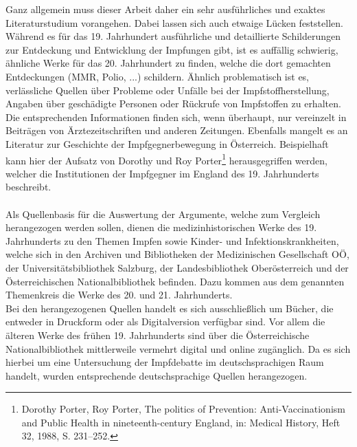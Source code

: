 \documentclass[
    a4paper,
    12pt,
    hyphens,
    chapterprefix=true,
    headheight=33pt,
    footheight=29pt,
    headings=optiontohead, %
]{scrartcl}
\begin{document}
Ganz allgemein muss dieser Arbeit daher ein sehr ausführliches und exaktes Literaturstudium vorangehen. Dabei lassen sich auch etwaige Lücken feststellen. Während es für das 19. Jahrhundert ausführliche und detaillierte Schilderungen zur Entdeckung und Entwicklung der Impfungen gibt, ist es auffällig schwierig, ähnliche Werke für das 20. Jahrhundert zu finden, welche die dort gemachten Entdeckungen (MMR, Polio, ...) schildern. Ähnlich problematisch ist es, verlässliche Quellen über Probleme oder Unfälle bei der Impfstoffherstellung, Angaben über geschädigte Personen oder Rückrufe von Impfstoffen zu erhalten. Die entsprechenden Informationen finden sich, wenn überhaupt, nur vereinzelt in Beiträgen von Ärztezeitschriften und anderen Zeitungen. Ebenfalls mangelt es an Literatur zur Geschichte der Impfgegnerbewegung in Österreich. Beispielhaft kann hier der Aufsatz von Dorothy und Roy Porter\footnote{Dorothy Porter, Roy Porter, The politics of Prevention: Anti-Vaccinationism and Public Health in nineteenth-century England, in: Medical History, Heft 32, 1988, S. 231--252.} herausgegriffen werden, welcher die Institutionen der Impfgegner im England des 19. Jahrhunderts beschreibt.\\
\\
Als Quellenbasis für die Auswertung der Argumente, welche zum Vergleich herangezogen werden sollen, dienen die medizinhistorischen Werke des 19. Jahrhunderts zu den Themen Impfen sowie Kinder- und Infektionskrankheiten, welche sich in den Archiven und Bibliotheken der Medizinischen Gesellschaft OÖ, der Universitätsbibliothek Salzburg, der Landesbibliothek Oberösterreich und der Österreichischen Nationalbibliothek befinden. Dazu kommen aus dem genannten Themenkreis die Werke des 20. und 21. Jahrhunderts.\\
Bei den herangezogenen Quellen handelt es sich ausschließlich um Bücher, die entweder in Druckform oder als Digitalversion verfügbar sind. Vor allem die älteren Werke des frühen 19. Jahrhunderts sind über die Österreichische Nationalbibliothek mittlerweile vermehrt digital und online zugänglich. Da es sich hierbei um eine Untersuchung der Impfdebatte im deutschsprachigen Raum handelt, wurden entsprechende deutschsprachige Quellen herangezogen.\\
\end{document}
